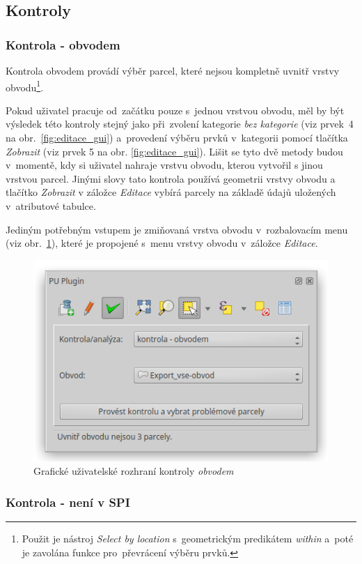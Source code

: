 \subsection{Kontroly}
\label{kontroly}

\subsubsection{Kontrola - obvodem}
\label{kontrola_obvodem}

Kontrola obvodem provádí výběr parcel, které nejsou kompletně uvnitř vrstvy obvodu\footnote{Použit je nástroj \textit{Select by location} s~geometrickým predikátem \textit{within} a~poté je zavolána funkce pro~převrácení výběru prvků.}.

Pokud uživatel pracuje od~začátku pouze s~jednou vrstvou obvodu, měl by být výsledek této kontroly stejný jako při~zvolení kategorie \textit{bez kategorie} (viz prvek~4 na obr.~\ref{fig:editace_gui}) a~provedení výběru prvků v~kategorii pomocí tlačítka \textit{Zobrazit} (viz prvek 5 na obr. \ref{fig:editace_gui}). Lišit se tyto dvě metody budou v~momentě, kdy si uživatel nahraje vrstvu obvodu, kterou vytvořil s jinou vrstvou parcel. Jinými slovy tato kontrola používá geometrii vrstvy obvodu a tlačítko \textit{Zobrazit} v záložce \textit{Editace} vybírá parcely na základě údajů uložených v~atributové tabulce.

Jediným potřebným vstupem je zmiňovaná vrstva obvodu v~rozbalovacím menu (viz obr.~\ref{fig:kontrola_obvodem_gui}), které je propojené s~menu vrstvy obvodu v~záložce \textit{Editace}.

	\begin{figure}[H]
		\centering
		\includegraphics[width=.55\textwidth]{./pictures/kontrola-obvodem.png}
		\caption[Grafické uživatelské rozhraní kontroly \textit{obvodem}]{Grafické uživatelské rozhraní kontroly \textit{obvodem}}
		\label{fig:kontrola_obvodem_gui}
 	\end{figure}

\subsubsection{Kontrola - není v SPI}
\label{kontrola_neni_v_spi}


